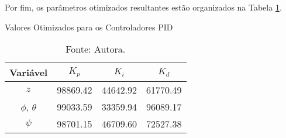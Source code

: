 Por fim, os parâmetros otimizados resultantes estão organizados na Tabela \ref{tab:pid_values}.
\begin{table}[h!]
    \centering
    \caption{Valores Otimizados para os Controladores PID} \vspace{-0.3cm}
    \label{tab:pid_values}
    \begin{tabular}{|c|c|c|c|}
        \hline
        \textbf{Variável} & \textbf{$K_p$} & \textbf{$K_i$} & \textbf{$K_d$} \\ \hline
        $z$              & 98869.42       & 44642.92       & 61770.49       \\ \hline
        $\phi$, $\theta$ & 99033.59       & 33359.94       & 96089.17       \\ \hline
        $\psi$           & 98701.15       & 46709.60       & 72527.38       \\ \hline
    \end{tabular}
    \caption*{\footnotesize{Fonte: Autora.}} \vspace{-0.55cm}
\end{table}